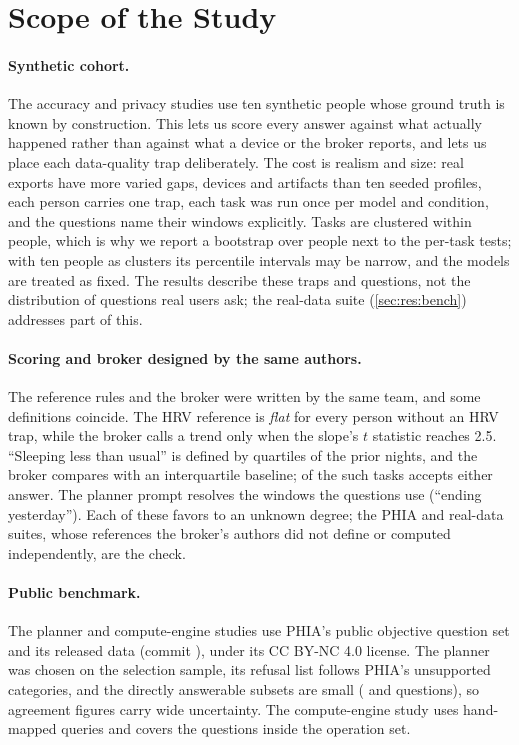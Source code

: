\section{Scope of the Study}\label{sec:scope}

\paragraph{Synthetic cohort.} The accuracy and privacy studies use ten synthetic people whose ground truth is known
by construction. This lets us score every answer against what actually happened rather than against what a device
or the broker reports, and lets us place each data-quality trap deliberately. The cost is realism and size: real
exports have more varied gaps, devices and artifacts than ten seeded profiles, each person carries one trap, each
task was run once per model and condition, and the questions name their windows explicitly. Tasks are clustered
within people, which is why we report a bootstrap over people next to the per-task tests; with ten people as
clusters its percentile intervals may be narrow, and the models are treated as fixed. The results describe these
traps and questions, not the distribution of questions real users ask; the real-data suite (\cref{sec:res:bench})
addresses part of this.

\paragraph{Scoring and broker designed by the same authors.} The reference rules and the broker were written by the
same team, and some definitions coincide. The HRV reference is \emph{flat} for every person without an HRV trap,
while the broker calls a trend only when the slope's $t$ statistic reaches 2.5. ``Sleeping less than usual'' is
defined by quartiles of the prior nights, and the broker compares with an interquartile baseline; \usualLenient{} of
the \usualTasks{} such tasks accepts either answer. The planner prompt resolves the windows the questions use
(``ending yesterday''). Each of these favors \CC{} to an unknown degree; the PHIA and real-data suites, whose
references the broker's authors did not define or computed independently, are the check.

\paragraph{Public benchmark.} The planner and compute-engine studies use PHIA's public objective question set and
its released data (commit \code{\phiaCommit}), under its CC BY-NC 4.0 license. The planner was chosen on the
selection sample, its refusal list follows PHIA's unsupported categories, and the directly answerable subsets are
small (\plLlamaThreeNAns{} and \plHeldLlamaThreeNAns{} questions), so agreement figures carry wide uncertainty. The
compute-engine study uses hand-mapped queries and covers the \phiaMapped{} questions inside the operation set.

